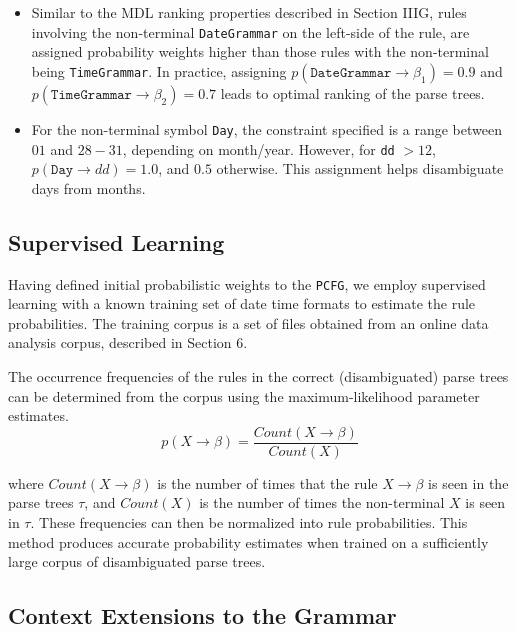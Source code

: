 \begin{itemize}
\item Similar to the MDL ranking properties described in Section IIIG, rules involving the non-terminal \texttt{DateGrammar} on the left-side of the rule, are assigned probability weights higher than those rules with the non-terminal being \texttt{TimeGrammar}. In practice, assigning $p(\texttt{DateGrammar} \rightarrow \beta_{1}) = 0.9$ and $p(\texttt{TimeGrammar} \rightarrow \beta_{2}) = 0.7$ leads to optimal ranking of the parse trees.

\item For the non-terminal symbol \texttt{Day}, the constraint specified is a range between $01$ and $28-31$, depending on month/year. However, for \texttt{dd} $> 12$, $p(\texttt{Day} \rightarrow d d) = 1.0$, and $0.5$ otherwise. This assignment helps disambiguate days from months.




\end{itemize}

\subsection{Supervised Learning}

Having defined initial probabilistic weights to the \texttt{PCFG}, we employ supervised learning with a known training set of date time formats to estimate the rule probabilities.  The training corpus is a set of files obtained from an online data analysis corpus, described in Section 6.

The occurrence frequencies of the rules in the correct
(disambiguated) parse trees can be determined from the corpus using the maximum-likelihood parameter estimates.
\begin{equation}
p(X \rightarrow \beta) = \frac{Count(X \rightarrow \beta)}{Count(X)}
\end{equation}

where $Count(X \rightarrow \beta)$ is the number of times that the rule $X \rightarrow \beta$ is seen in
the parse trees $\tau$, and $Count(X)$ is the number of times the non-terminal $X$ is seen in $\tau$. These frequencies can then be normalized into rule probabilities. This method produces accurate probability estimates when trained on a sufficiently large corpus of disambiguated parse trees. 

\subsection{Context Extensions to the Grammar}

